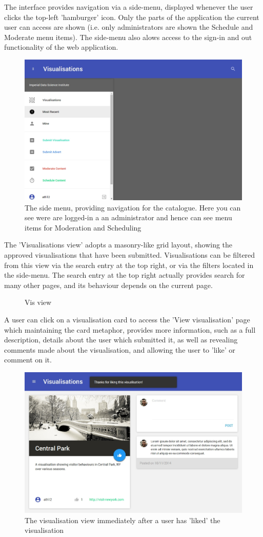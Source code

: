 \documentclass[a4paper, titlepage]{article}
\begin{document}
The interface provides navigation via a side-menu, displayed whenever the user clicks the top-left 'hamburger' icon. Only the parts of the application the current user can access are shown (i.e. only administrators are shown the Schedule and Moderate menu items). The side-menu also alows access to the sign-in and out functionality of the web application.

\begin{figure}[h!]
  \centering
  \includegraphics[width=.6\textwidth]{./design/menu.jpg}
  \caption{The side menu, providing navigation for the catalogue. Here you can see were are logged-in a an administrator and hence can see menu items for Moderation and Scheduling}
  \label{fig:menu_screenshot}
\end{figure}

The 'Visualisations view' adopts a masonry-like grid layout, showing the approved visualisations that have been submitted. Visualisations can be filtered from this view via the search entry at the top right, or via the filters located in the side-menu. The search entry at the top right actually provides search for many other pages, and its behaviour depends on the current page.

\begin{figure}[h!]
  \centering

  \caption{Vis view}
  \label{fig:masonry_screenshot}
\end{figure}

A user can click on a visualisation card to access the 'View visualisation' page which maintaining the card metaphor, provides more information, such as a full description, details about the user which submitted it, as well as revealing comments made about the visualisation, and allowing the user to 'like' or comment on it.

\begin{figure}[h!]
  \centering
  \includegraphics[width=.6\textwidth]{./design/like.jpg}
  \caption{The visualisation view immediately after a user has 'liked' the visualisation}
  \label{fig:menu_screenshot}
\end{figure}
\end{document}
